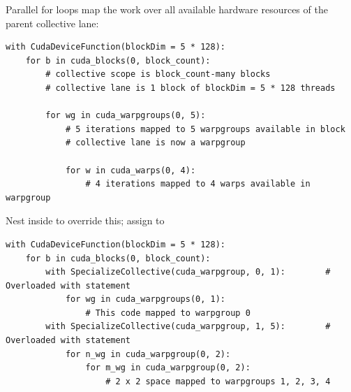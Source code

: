\newpage
{}

Parallel for loops map the work over all available hardware resources of the parent collective lane:
\begin{verbatim}
with CudaDeviceFunction(blockDim = 5 * 128):
    for b in cuda_blocks(0, block_count):
        # collective scope is block_count-many blocks
        # collective lane is 1 block of blockDim = 5 * 128 threads

        for wg in cuda_warpgroups(0, 5):
            # 5 iterations mapped to 5 warpgroups available in block
            # collective lane is now a warpgroup

            for w in cuda_warps(0, 4):
                # 4 iterations mapped to 4 warps available in warpgroup
\end{verbatim}
Nest inside  to override this; assign  to 
\begin{verbatim}
with CudaDeviceFunction(blockDim = 5 * 128):
    for b in cuda_blocks(0, block_count):
        with SpecializeCollective(cuda_warpgroup, 0, 1):        # Overloaded with statement
            for wg in cuda_warpgroups(0, 1):
                # This code mapped to warpgroup 0
        with SpecializeCollective(cuda_warpgroup, 1, 5):        # Overloaded with statement
            for n_wg in cuda_warpgroup(0, 2):
                for m_wg in cuda_warpgroup(0, 2):
                    # 2 x 2 space mapped to warpgroups 1, 2, 3, 4
\end{verbatim}

\newpage
{}

